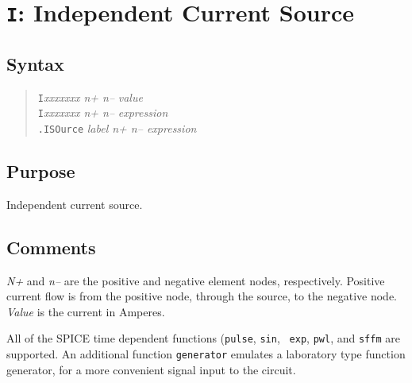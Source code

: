 %
%
%
%
\section{{\tt I}: Independent Current Source}
\subsection{Syntax}
\begin{verse}
{\tt I}{\it xxxxxxx n+ n--} {\it value}\\
{\tt I}{\it xxxxxxx n+ n--} {\it expression}\\
{\tt .ISOurce} {\it label n+ n-- expression}
\end{verse}
\subsection{Purpose}

Independent current source.
\subsection{Comments}

{\it N+} and {\it n--} are the positive and negative element nodes,
respectively.  Positive current flow is from the positive node, through the
source, to the negative node.  {\it Value} is the current in Amperes.

All of the SPICE time dependent functions ({\tt pulse}, {\tt sin}, {\tt
exp}, {\tt pwl}, and {\tt sffm} are supported.  An additional
function {\tt generator} emulates a laboratory type function generator, for
a more convenient signal input to the circuit.

